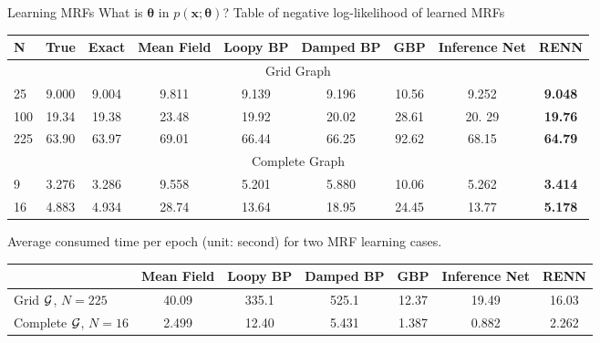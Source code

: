 




\begin{frame}
  {Learning MRFs}
  {What is $\bm{\theta}$ in $p(\bm{x};\bm{\theta})$?}
  \vskip 0.5cm
  Table of negative log-likelihood of learned MRFs \\
  \begin{table}
    \begin{adjustbox}{width=0.9\textwidth}
      \begin{tabular}{lcccccccc}
        \toprule
        N & True & Exact & Mean Field & Loopy BP & Damped BP & GBP & Inference Net & RENN \\
        \toprule
        \multicolumn{9}{c}{Grid Graph}\\
        \midrule
        25  &  9.000  &  9.004  &  9.811  &  {9.139}  &  9.196  &  10.56  &  9.252  &  \textbf{9.048}  \\
        100 &  19.34  &  19.38  &  23.48  &  {19.92}  &  20.02  &  28.61  &  20. 29  &  \textbf{19.76} \\
        225 &  63.90  &  63.97  &  69.01  &  66.44    &  66.25  &  92.62  &  68.15  &  \textbf{64.79}  \\
        \toprule
        \multicolumn{9}{c}{Complete Graph}\\
        \midrule
        9  &  3.276  &  3.286  &  9.558  &  5.201  &  5.880  &  10.06  &  5.262  & \textbf{3.414}  \\
        16  &  4.883  &  4.934  &  28.74  &  13.64  &  18.95  &  24.45  &  13.77  &  \textbf{5.178}  \\

        \bottomrule
      \end{tabular}
    \end{adjustbox}
  \end{table}
  \vskip 0.5cm
  {Average consumed time per epoch (unit: second) for two MRF learning cases.}
  \begin{table}
    \centering
    \begin{adjustbox}{width=0.9\textwidth}
      \begin{tabular}{lcccccc}
        \toprule
        {} &  Mean Field & Loopy BP & Damped BP & GBP & Inference Net & RENN \\
        \toprule
        Grid $\mathcal{G}$,\! $N\!=\!225\!\!$ & 40.09 & 335.1 & 525.1 & 12.37 & 19.49 & 16.03 \\
        Complete\! $\mathcal{G}$,\! $N=\!16\!\!$ & 2.499 & 12.40 & 5.431 & 1.387 & 0.882 & 2.262 \\
        \bottomrule
      \end{tabular}
    \end{adjustbox}
  \end{table}

\end{frame}

